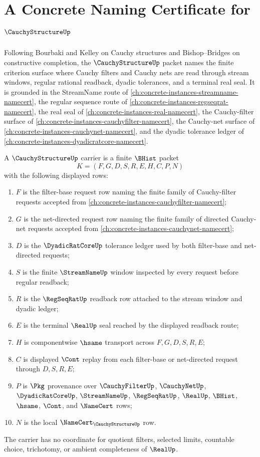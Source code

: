 \chapter{A Concrete Naming Certificate for $\CauchyStructureUp$}
\label{ch:concrete-instances-cauchy-structure-namecert}

Following Bourbaki and Kelley on Cauchy structures and Bishop--Bridges on constructive completion, the $\CauchyStructureUp$ packet names the finite criterion surface where Cauchy filters and Cauchy nets are read through stream windows, regular rational readback, dyadic tolerances, and a terminal real seal. It is grounded in the StreamName route of \autoref{ch:concrete-instances-streamname-namecert}, the regular sequence route of \autoref{ch:concrete-instances-regseqrat-namecert}, the real seal of \autoref{ch:concrete-instances-real-namecert}, the Cauchy-filter surface of \autoref{ch:concrete-instances-cauchyfilter-namecert}, the Cauchy-net surface of \autoref{ch:concrete-instances-cauchynet-namecert}, and the dyadic tolerance ledger of \autoref{ch:concrete-instances-dyadicratcore-namecert}.

\begin{definition}
\label{def:cauchy-structure-carrier}
A $\CauchyStructureUp$ carrier is a finite $\BHist$ packet
$$
K=(F,G,D,S,R,E,H,C,P,N)
$$
with the following displayed rows:
\begin{enumerate}
\item $F$ is the filter-base request row naming the finite family of Cauchy-filter requests accepted from \autoref{ch:concrete-instances-cauchyfilter-namecert};
\item $G$ is the net-directed request row naming the finite family of directed Cauchy-net requests accepted from \autoref{ch:concrete-instances-cauchynet-namecert};
\item $D$ is the $\DyadicRatCoreUp$ tolerance ledger used by both filter-base and net-directed requests;
\item $S$ is the finite $\StreamNameUp$ window inspected by every request before regular readback;
\item $R$ is the $\RegSeqRatUp$ readback row attached to the stream window and dyadic ledger;
\item $E$ is the terminal $\RealUp$ seal reached by the displayed readback route;
\item $H$ is componentwise $\hsame$ transport across $F,G,D,S,R,E$;
\item $C$ is displayed $\Cont$ replay from each filter-base or net-directed request through $D,S,R,E$;
\item $P$ is $\Pkg$ provenance over $\CauchyFilterUp$, $\CauchyNetUp$, $\DyadicRatCoreUp$, $\StreamNameUp$, $\RegSeqRatUp$, $\RealUp$, $\BHist$, $\hsame$, $\Cont$, and $\NameCert$ rows;
\item $N$ is the local $\NameCert_{\CauchyStructureUp}$ row.
\end{enumerate}
The carrier has no coordinate for quotient filters, selected limits, countable choice, trichotomy, or ambient completeness of $\RealUp$.
\end{definition}

